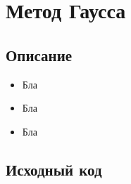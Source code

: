 \documentclass[../../report.tex]{subfiles}
\begin{document}
\chapter{Метод Гаусса}

\section{Описание}
\begin{itemize}
    \item Бла
    \item Бла
    \item Бла
\end{itemize}

\section{Исходный код}
\end{document}
